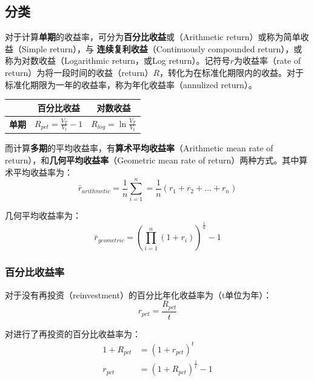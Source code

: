 \documentclass[11pt]{article}
\begin{document}
\subsection{分类}

对于计算\textbf{单期}的收益率，可分为\textbf{百分比收益}或（Arithmetic return）或称为简单收益（Simple return），与
\textbf{连续复利收益}（Continuously compounded return），或称为对数收益（Logarithmic return，或Log return）。记符号$r$为收益率（rate of return）为将一段时间的收益（return）$R$，转化为在标准化期限内的收益。对于标准化期限为一年的收益率，称为年化收益率（annulized return）。
\begin{table}[H]
\centering
\begin{tabular}{@{}cll@{}}
\toprule
\multicolumn{1}{l}{}
& \multicolumn{1}{c}{\textbf{百分比收益}} & \multicolumn{1}{c}{\textbf{对数收益}} \\
\midrule
\multirow{1}{*}{\textbf{单期}} 
& $R_{pct} = \frac{V_T}{V_t}-1$
& $R_{log} = \ln \frac{V_T}{V_t}$ \\
\bottomrule
\end{tabular}
\end{table}

而计算\textbf{多期}的平均收益率，有\textbf{算术平均收益率}（Arithmetic mean rate of return），和\textbf{几何平均收益率}（Geometric mean rate of return）两种方式。其中算术平均收益率为：
\begin{equation*}
    \bar{r}_{arithmetic} = \frac{1}{n} \sum^{n}_{i=1} = \frac{1}{n} (r_1 + r_2 + \dots + r_n)
\end{equation*}

几何平均收益率为：
\begin{equation*}
    \bar{r}_{geometric} = \left( \prod^{n}_{i=1}(1+r_i) \right)^{\frac{1}{n}} - 1
\end{equation*}

\subsubsection*{百分比收益率}

对于没有再投资（reinvestment）的百分比年化收益率为（t单位为年）：
\begin{equation*}
    r_{pct} = \frac{R_{pct}}{t}
\end{equation*}

对进行了再投资的百分比收益率为：
\begin{align*}
    1+R_{pct} &= (1+r_{pct})^t \\
    r_{pct} &= (1+R_{pct})^{\frac{1}{t}} - 1
\end{align*}
\end{document}
